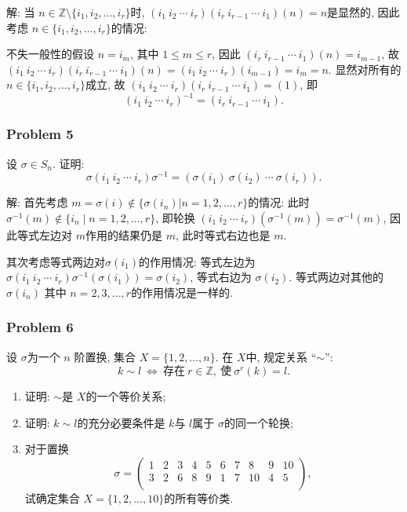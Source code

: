 \documentclass[a4paper,12pt]{ctexart}
\newcommand{\Z}{\mathbb{Z}}
\begin{document}
    解: 当 $ n\in\Z\setminus\{i_1,i_2,\dots,i_r\} $时, 
    $ \left(i_1~i_2~\cdots~i_r\right)\left(i_r~i_{r-1}~\cdots~i_1\right)(n)=n $是显然的, 
    因此考虑 $ n\in\{i_1,i_2,\dots,i_r\} $的情况: 

    不失一般性的假设 $ n=i_m $, 其中 $ 1\le m\le r $, 因此 $ \left(i_r~i_{r-1}~\cdots~i_1\right)(n)=i_{m-1} $, 
    故 $ \left(i_1~i_2~\cdots~i_r\right)\left(i_r~i_{r-1}~\cdots~i_1\right)(n)=\left(i_1~i_2~\cdots~i_r\right)(i_{m-1})=i_m=n $. 
    显然对所有的 $ n\in\{i_1,i_2,...,i_r\} $成立, 故 $ \left(i_1~i_2~\cdots~i_r\right)\left(i_r~i_{r-1}~\cdots~i_1\right)=(1) $, 即
    \[\left(i_1~i_2~\cdots~i_r\right)^{-1}=\left(i_r~i_{r-1}~\cdots~i_1\right).\]

\subsubsection*{Problem 5}
  设 $ \sigma\in S_n $. 证明: 
  \[\sigma\left(i_1~i_2~\cdots~i_r\right)\sigma^{-1}=\left(\sigma(i_1)~\sigma(i_2)~\cdots~\sigma(i_r)\right).\]

    解: 首先考虑 $ m=\sigma(i)\notin\{\sigma(i_n)|n=1,2,\dots,r\} $的情况: 此时 $ \sigma^{-1}(m)\notin\{i_n\mid n=1,2,...,r\} $, 
    即轮换 $ \left(i_1~i_2~\cdots~i_r\right)(\sigma^{-1}(m))=\sigma^{-1}(m) $, 因此等式左边对 $ m $作用的结果仍是 $ m $, 
    此时等式右边也是 $ m $. 
    
    其次考虑等式两边对$ \sigma(i_1) $的作用情况: 
    等式左边为 $ \sigma\left(i_1~i_2~\cdots~i_r\right)\sigma^{-1}(\sigma(i_1))=\sigma(i_2) $, 等式右边为 $ \sigma(i_2) $.
    等式两边对其他的 $ \sigma(i_n) $ 其中 $ n=2,3,...,r $的作用情况是一样的.

\subsubsection*{Problem 6}
  设 $ \sigma $为一个 $ n $ 阶置换, 集合 $ X=\{1,2,...,n\} $. 在 $ X $中, 规定关系 ``$\sim$'': 
  \[k\sim l~\Longleftrightarrow~\text{存在}~r\in\Z, ~\text{使} ~\sigma^r(k)=l.\]
  \begin{enumerate}[label=(\arabic{*})]
    \item 证明: $ \sim $是 $ X $的一个等价关系;
    \item 证明: $ k\sim l $的充分必要条件是 $ k $与 $ l $属于 $ \sigma  $的同一个轮换;
    \item 对于置换
    \[\sigma=\begin{pmatrix}
      1 &2 &3 &4 &5 &6 &7 &8  &9 &10 \\
      3 &2 &6 &8 &9 &1 &7 &10 &4 &5 \\
    \end{pmatrix},\]
    试确定集合 $ X=\{1,2,...,10\} $的所有等价类.
  \end{enumerate}
  
\end{document}
